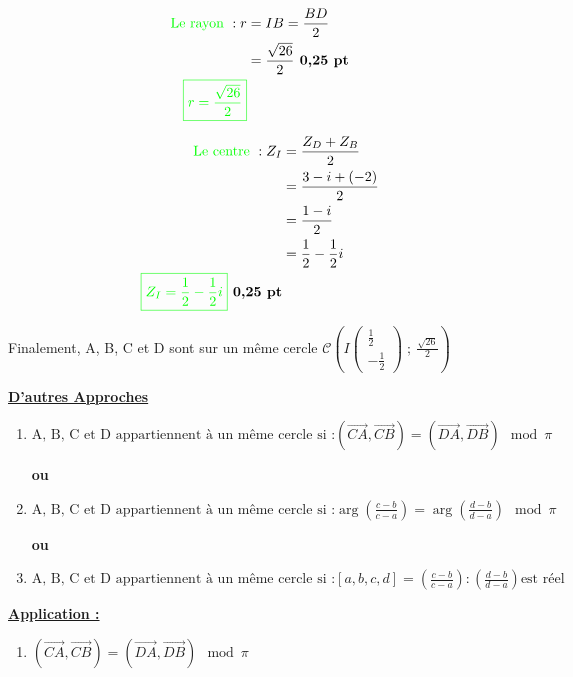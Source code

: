 \documentclass[12pt]{article}
\begin{document}
\begin{enumerate}
\begin{enumerate}
\begin{align*}
\text{\textcolor{green}{Le rayon }} : r&=IB=\frac{BD}{2}\\
&=\frac{\sqrt{26}}{2}\textbf{ 0,25 pt}\\
\textcolor{green}{\boxed{r=\frac{\sqrt{26}}{2}}}
\end{align*}

\begin{align*}
\text{\textcolor{green}{Le centre }} : Z_{I}&=\frac{Z_{D}+Z_{B}}{2}\\
&=\frac{3-i+(-2)}{2}\\
&=\frac{1-i}{2}\\
&=\frac{1}{2}-\frac{1}{2}i \\
\textcolor{green}{\boxed{Z_{I}=\frac{1}{2}-\frac{1}{2}i}}\textbf{ 0,25 pt}
\end{align*}

Finalement, A, B, C et D sont sur un même cercle $\mathcal{C}\left(I\begin{pmatrix} \frac{1}{2} \\ -\frac{1}{2}\end{pmatrix}\;;\ \frac{\sqrt{26}}{2}\right)$

\begin{center}
\textbf{\underline{D'autres Approches}}
\end{center}
\begin{enumerate}
\item 
$\text{A, B, C et D appartiennent à un même cercle si :}\left({\overrightarrow {CA}},{\overrightarrow {CB}}\right)=\left({\overrightarrow {DA}},{\overrightarrow {DB}}\right)\mod \pi $

\textbf{ou}
\item
$\text{A, B, C et D appartiennent à un même cercle si :}\arg \left({\frac {c-b}{c-a}}\right)=\arg \left({\frac {d-b}{d-a}}\right)\mod \pi $

\textbf{ou}
\item
$\text{A, B, C et D appartiennent à un même cercle si :}\left[ a,b,c,d \right] =\left({\frac {c-b}{c-a}}\right):\left({\frac {d-b}{d-a}}\right) \text{est réel}
$
\end{enumerate}
\begin{center}
\textbf{\underline{Application :}}
\end{center}
\begin{enumerate}

\item 
$\left({\overrightarrow {CA}},{\overrightarrow {CB}}\right)=\left({\overrightarrow {DA}},{\overrightarrow {DB}}\right)\mod \pi $


\end{enumerate}
\end{enumerate}
\end{enumerate}
\end{document}
